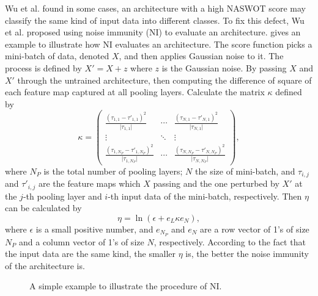 \documentclass[sigconf]{acmart}
\begin{document}
    Wu et al. \cite{10092788} found in some cases, an architecture with a high 
    NASWOT score may classify the same kind of input data into different classes. 
    To fix this defect, Wu et al. proposed using noise immunity (NI) to 
    evaluate an architecture.  gives an example to illustrate how 
    NI evaluates an architecture. The score function picks a 
    mini-batch of data, denoted $X$, and then applies Gaussian noise to it. 
    The process is defined by $X'=X+z$ where $z$ is the Gaussian noise. 
    By passing $X$ and $X'$ through the untrained architecture, then computing 
    the difference of square of each feature map captured at all pooling layers. 
    Calculate the matrix $\kappa$ defined by 
    \begin{equation}
        \label{equ:ni_kappa}
        \kappa=\begin{pmatrix}\frac{(\tau_{1,1}-\tau'_{1,1})^2}{\lvert \tau_{1,1}\rvert}&\cdots&\frac{(\tau_{N,1}-\tau'_{N,1})^2}{\lvert \tau_{N,1}\rvert}\\\vdots&\ddots&\vdots\\\frac{(\tau_{1,N_P}-\tau'_{1,N_P})^2}{\lvert \tau_{1,N_P}\rvert}&\cdots&\frac{(\tau_{N,N_P}-\tau'_{N,N_P})^2}{\lvert \tau_{N,N_P}\rvert}\end{pmatrix},
    \end{equation}
    where $N_P$ is the total number of pooling layers; $N$ the size of mini-batch, 
    and $\tau_{i,j}$ and $\tau'_{i,j}$ are the feature maps which $X$ passing and 
    the one perturbed by $X'$ at the $j$-th pooling layer and $i$-th input 
    data of the mini-batch, respectively. 
    Then $\eta$ can be calculated by 
    \begin{equation}
        \label{equ:ni_eta}
        \eta=\ln(\epsilon+e_L\kappa e_N),
    \end{equation}
    where $\epsilon$ is a small positive number, and $e_{N_P}$ and $e_N$ are a row 
    vector of 1's of size $N_P$ and a column vector of 1's of size $N$, respectively. 
    According to the fact that the input data are the same kind, the smaller $\eta$ 
    is, the better the noise immunity of the architecture is.

    \begin{figure*}[tb]
        \vspace{-\baselineskip}
        \caption{A simple example to illustrate the procedure of NI.}
        \label{fig:ni}
        \centering
        \vspace{-\baselineskip}
    \end{figure*}
\end{document}
